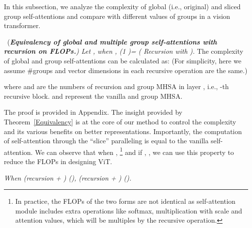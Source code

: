 \documentclass[runningheads]{llncs}
\begin{document}
	 In this subsection, we analyze the complexity of global ({i.e.,} original) and sliced group self-attentions and compare with different values of groups in a vision transformer.
	\begin{theorem} \label{Equivalency} 
		\ ({\em {\bf \em Equivalency of global and multiple group self-attentions with recursion on FLOPs.}) {\em Let , when  ,  (1 )= ( Recursion with )}.}
		The complexity  of global and group self-attentions can be calculated as: (For simplicity, here we assume \#groups and vector dimensions in each recursive operation are the same.)
		
		where  and  are the numbers of recursion and group MHSA in layer , i.e., -th recursive block.  and  represent the vanilla and group MHSA.
	\end{theorem}
	The proof is provided in Appendix. The insight provided by Theorem~\ref{Equivalency} is at the core of our method to control the complexity and its various benefits on better representations. Importantly, the computation of self-attention through the ``slice'' paralleling is equal to the vanilla self-attention. We can observe that when {\em }, {\em }\footnote{In practice, the FLOPs of the two forms are not identical as self-attention module includes extra operations like softmax, multiplication with scale and attention values, which will be multiples by the recursive operation.} and if {\em }, {\em }, we can use this property to reduce the FLOPs in designing ViT. 
	
	  {\em When (recursion  + )  (), (recursion + )  ().}
	
	\begin{table}[t]
		\centering
		\caption{Representation ability with global/group self-attentions.}
		\label{tab:rep} \vspace{0.08in}
	\end{table}
	
\end{document}

